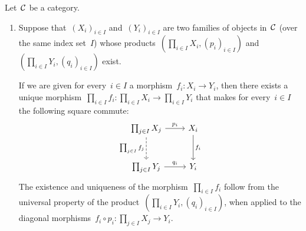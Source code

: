 \begin{remark*}
  \label{functoriality of (co)product}
  Let~$\mathcal{C}$ be a category.
  \begin{enumerate}
    \item
      Suppose that~$(X_i)_{i \in I}$ and~$(Y_i)_{i \in I}$ are two families of objects in~$\mathcal{C}$ (over the same index set~$I$) whose products~$(\prod_{i \in I} X_i, (p_i)_{i \in I})$ and~$(\prod_{i \in I} Y_i, (q_i)_{i \in I})$ exist.
      
      If we are given for every~$i \in I$ a morphism~$f_i \colon X_i \to Y_i$, then there exists a unique morphism~$\prod_{i \in I} f_i \colon \prod_{i \in I} X_i \to \prod_{i \in I} Y_i$ that makes for every~$i \in I$ the following square commute:
      \[
        \begin{tikzcd}[row sep = large]
            \prod_{j \in I} X_j
            \arrow{r}[above]{p_i}
            \arrow[dashed]{d}[left]{\prod_{j \in I} f_j}
          & X_i
            \arrow{d}[right]{f_i}
          \\
            \prod_{j \in I} Y_j
            \arrow{r}[above]{q_i}
          & Y_i
        \end{tikzcd}
      \]
      The existence and uniqueness of the morphism~$\prod_{i \in I} f_i$ follow from the universal property of the product~$(\prod_{i \in I} Y_i, (q_i)_{i \in I})$, when applied to the diagonal morphisms~$f_i \circ p_i \colon \prod_{j \in I} X_j \to Y_i$.
      

\end{enumerate}
\end{remark*}
